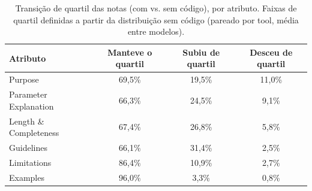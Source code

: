 \begin{table}[H]
\centering
\caption{Transição de quartil das notas (com vs. sem código), por atributo. Faixas de quartil definidas a partir da distribuição sem código (pareado por tool, média entre modelos).}
\label{tab:transicao_quartis}
\begin{tabular}{lccc}
\toprule
Atributo & Manteve o quartil & Subiu de quartil & Desceu de quartil \\
\midrule
Purpose & 69,5\% & 19,5\% & 11,0\% \\
Parameter Explanation & 66,3\% & 24,5\% & 9,1\% \\
Length \& Completeness & 67,4\% & 26,8\% & 5,8\% \\
Guidelines & 66,1\% & 31,4\% & 2,5\% \\
Limitations & 86,4\% & 10,9\% & 2,7\% \\
Examples & 96,0\% & 3,3\% & 0,8\% \\
\bottomrule
\end{tabular}
\end{table}
